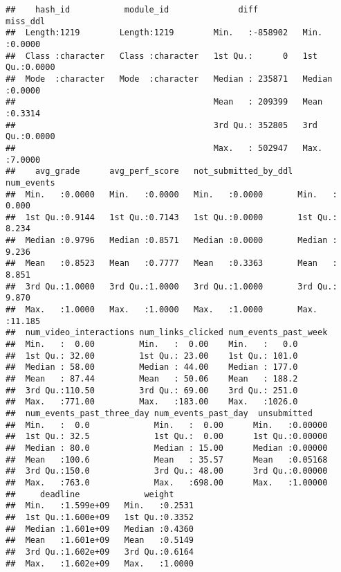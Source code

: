 \documentclass[
]{article}
\newenvironment{Shaded}{\begin{snugshade}}{\end{snugshade}}
\newcommand{\KeywordTok}[1]{\textcolor[rgb]{0.13,0.29,0.53}{\textbf{#1}}}
\newcommand{\NormalTok}[1]{#1}
\newcommand{\OperatorTok}[1]{\textcolor[rgb]{0.81,0.36,0.00}{\textbf{#1}}}
\newcommand{\StringTok}[1]{\textcolor[rgb]{0.31,0.60,0.02}{#1}}
\begin{document}
\begin{verbatim}
##    hash_id           module_id              diff            miss_ddl     
##  Length:1219        Length:1219        Min.   :-858902   Min.   :0.0000  
##  Class :character   Class :character   1st Qu.:      0   1st Qu.:0.0000  
##  Mode  :character   Mode  :character   Median : 235871   Median :0.0000  
##                                        Mean   : 209399   Mean   :0.3314  
##                                        3rd Qu.: 352805   3rd Qu.:0.0000  
##                                        Max.   : 502947   Max.   :7.0000  
##    avg_grade      avg_perf_score   not_submitted_by_ddl   num_events    
##  Min.   :0.0000   Min.   :0.0000   Min.   :0.0000       Min.   : 0.000  
##  1st Qu.:0.9144   1st Qu.:0.7143   1st Qu.:0.0000       1st Qu.: 8.234  
##  Median :0.9796   Median :0.8571   Median :0.0000       Median : 9.236  
##  Mean   :0.8523   Mean   :0.7777   Mean   :0.3363       Mean   : 8.851  
##  3rd Qu.:1.0000   3rd Qu.:1.0000   3rd Qu.:1.0000       3rd Qu.: 9.870  
##  Max.   :1.0000   Max.   :1.0000   Max.   :1.0000       Max.   :11.185  
##  num_video_interactions num_links_clicked num_events_past_week
##  Min.   :  0.00         Min.   :  0.00    Min.   :   0.0      
##  1st Qu.: 32.00         1st Qu.: 23.00    1st Qu.: 101.0      
##  Median : 58.00         Median : 44.00    Median : 177.0      
##  Mean   : 87.44         Mean   : 50.06    Mean   : 188.2      
##  3rd Qu.:110.50         3rd Qu.: 69.00    3rd Qu.: 251.0      
##  Max.   :771.00         Max.   :183.00    Max.   :1026.0      
##  num_events_past_three_day num_events_past_day  unsubmitted     
##  Min.   :  0.0             Min.   :  0.00      Min.   :0.00000  
##  1st Qu.: 32.5             1st Qu.:  0.00      1st Qu.:0.00000  
##  Median : 80.0             Median : 15.00      Median :0.00000  
##  Mean   :100.6             Mean   : 35.57      Mean   :0.05168  
##  3rd Qu.:150.0             3rd Qu.: 48.00      3rd Qu.:0.00000  
##  Max.   :763.0             Max.   :698.00      Max.   :1.00000  
##     deadline             weight      
##  Min.   :1.599e+09   Min.   :0.2531  
##  1st Qu.:1.600e+09   1st Qu.:0.3352  
##  Median :1.601e+09   Median :0.4360  
##  Mean   :1.601e+09   Mean   :0.5149  
##  3rd Qu.:1.602e+09   3rd Qu.:0.6164  
##  Max.   :1.602e+09   Max.   :1.0000
\end{verbatim}

\begin{Shaded}
\end{Shaded}
\end{document}
